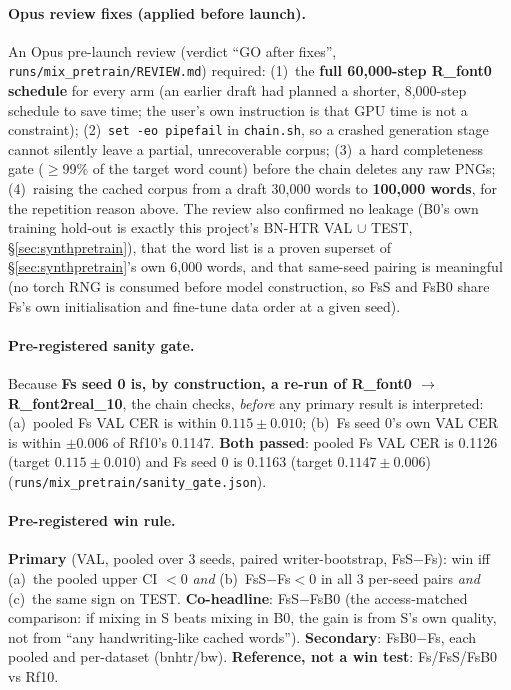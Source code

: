 \documentclass[10.5pt,a4paper]{article}
\newcommand{\fp}[1]{\nolinkurl{#1}}
\begin{document}
\paragraph{Opus review fixes (applied before launch).} An Opus pre-launch review (verdict ``GO after fixes'',
\fp{runs/mix_pretrain/REVIEW.md}) required: (1)~the \textbf{full 60,000-step R\_font0 schedule} for every arm (an earlier
draft had planned a shorter, 8,000-step schedule to save time; the user's own instruction is that GPU time is not a
constraint); (2)~\texttt{set -eo pipefail} in \fp{chain.sh}, so a crashed generation stage cannot silently leave a partial,
unrecoverable corpus; (3)~a hard completeness gate ($\ge$99\% of the target word count) before the chain deletes any raw
PNGs; (4)~raising the cached corpus from a draft 30,000 words to \textbf{100,000 words}, for the repetition reason above.
The review also confirmed no leakage (B0's own training hold-out is exactly this project's BN-HTR VAL $\cup$ TEST,
\S\ref{sec:synthpretrain}), that the word list is a proven superset of \S\ref{sec:synthpretrain}'s own 6,000 words, and
that same-seed pairing is meaningful (no torch RNG is consumed before model construction, so FsS and FsB0 share Fs's own
initialisation and fine-tune data order at a given seed).

\paragraph{Pre-registered sanity gate.} Because \textbf{Fs seed 0 is, by construction, a re-run of R\_font0 $\to$
R\_font2real\_10}, the chain checks, \emph{before} any primary result is interpreted: (a)~pooled Fs VAL CER is within
$0.115\pm0.010$; (b)~Fs seed 0's own VAL CER is within $\pm0.006$ of Rf10's 0.1147. \textbf{Both passed}: pooled Fs VAL CER
is 0.1126 (target $0.115\pm0.010$) and Fs seed 0 is 0.1163 (target $0.1147\pm0.006$) (\fp{runs/mix_pretrain/sanity_gate.json}).

\paragraph{Pre-registered win rule.} \textbf{Primary} (VAL, pooled over 3 seeds, paired writer-bootstrap, FsS$-$Fs): win iff
(a)~the pooled upper CI $<0$ \emph{and} (b)~FsS$-$Fs$<0$ in all 3 per-seed pairs \emph{and} (c)~the same sign on TEST.
\textbf{Co-headline}: FsS$-$FsB0 (the access-matched comparison: if mixing in S beats mixing in B0, the gain is from S's
own quality, not from ``any handwriting-like cached words''). \textbf{Secondary}: FsB0$-$Fs, each pooled and per-dataset
(bnhtr/bw). \textbf{Reference, not a win test}: Fs/FsS/FsB0 vs Rf10.
\end{document}
